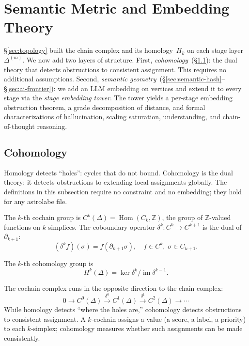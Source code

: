 \section{Semantic Metric and Embedding Theory}\label{sec:semantics}

\S\ref{sec:topology} built the chain complex and its homology~$H_k$ on each stage layer~$\Delta^{(m)}$.
We now add two layers of structure.
First, \emph{cohomology}~(\S\ref{sec:cohomology}): the dual theory that detects obstructions to consistent assignment. This requires no additional assumptions.
Second, \emph{semantic geometry}~(\S\ref{sec:semantic-hash}--\S\ref{sec:ai-frontier}): we add an LLM embedding on vertices and extend it to every stage via the \emph{stage embedding tower}. The tower yields a per-stage embedding obstruction theorem, a grade decomposition of distance, and formal characterizations of hallucination, scaling saturation, understanding, and chain-of-thought reasoning.


\subsection{Cohomology}\label{sec:cohomology}

Homology detects ``holes'': cycles that do not bound. Cohomology is the dual theory: it detects obstructions to extending local assignments globally. The definitions in this subsection require no constraint and no embedding; they hold for any astrolabe file.

\begin{definition}
\label{def:cochain}
The $k$-th cochain group is $C^k(\Delta) = \operatorname{Hom}(C_k, \mathbb{Z})$, the group of $\mathbb{Z}$-valued functions on $k$-simplices. The coboundary operator $\delta^k: C^k \to C^{k+1}$ is the dual of~$\partial_{k+1}$:
\[
  (\delta^k f)(\sigma) = f(\partial_{k+1}\sigma), \quad f \in C^k, \; \sigma \in C_{k+1}.
\]
\end{definition}

\begin{definition}[Cohomology]
\label{def:cohomology}
The $k$-th cohomology group is
\[
  H^k(\Delta) = \ker \delta^k / \operatorname{im} \delta^{k-1}.
\]
\end{definition}

The cochain complex runs in the opposite direction to the chain complex:
\[
  0 \to C^0(\Delta) \xrightarrow{\delta^0} C^1(\Delta) \xrightarrow{\delta^1} C^2(\Delta) \to \cdots
\]
While homology detects ``where the holes are,'' cohomology detects obstructions to consistent assignment. A $k$-cochain assigns a value (a score, a label, a priority) to each $k$-simplex; cohomology measures whether such assignments can be made consistently.

